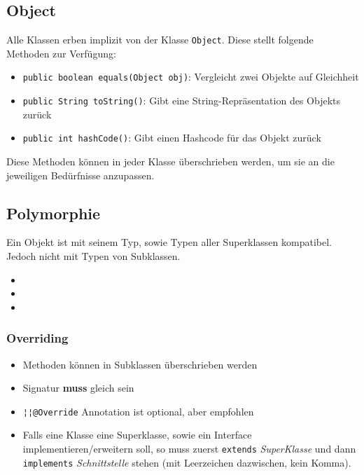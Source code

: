 \subsection{Object}
Alle Klassen erben implizit von der Klasse \lstinline{Object}. Diese stellt folgende Methoden zur Verfügung:
\begin{itemize}
    \item \lstinline{public boolean equals(Object obj)}: Vergleicht zwei Objekte auf Gleichheit
    \item \lstinline{public String toString()}: Gibt eine String-Repräsentation des Objekts zurück
    \item \lstinline{public int hashCode()}: Gibt einen Hashcode für das Objekt zurück
\end{itemize}
Diese Methoden können in jeder Klasse überschrieben werden, um sie an die jeweiligen Bedürfnisse anzupassen.

\subsection{Polymorphie}

\begin{minipage}[t]{0.65\columnwidth}
    Ein Objekt ist mit seinem Typ, sowie Typen aller Superklassen kompatibel. Jedoch nicht mit Typen von Subklassen.
\end{minipage}\hfill%
\begin{minipage}[t]{0.34\columnwidth}
    \begin{itemize}
        \item {}
        \item {}
        \item {}
    \end{itemize}
\end{minipage}

\subsubsection{Overriding}
\vspace{-0.7\abovedisplayskip}
\begin{minipage}[t]{0.5\columnwidth}
    
\end{minipage}
\begin{minipage}[t]{0.49\columnwidth}
    
\end{minipage}
\begin{itemize}
    \item Methoden können in Subklassen überschrieben werden
    \item Signatur \textbf{muss} gleich sein
    \item \lstinline{¦¦@Override} Annotation ist optional, aber empfohlen
    \item Falls eine Klasse eine Superklasse, sowie ein Interface implementieren/erweitern soll, so muss zuerst \lstinline{extends} \textit{SuperKlasse} und dann \lstinline{implements} \textit{Schnittstelle} stehen (mit Leerzeichen dazwischen, kein Komma).
\end{itemize}
